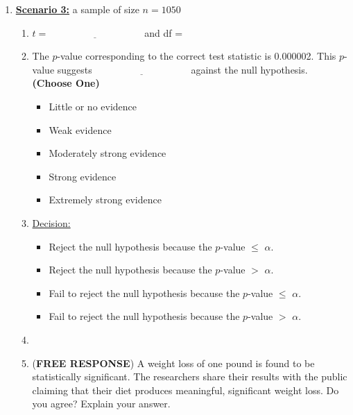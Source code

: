 \begin{enumerate}
\begin{enumerate}
\begin{enumerate}
\item \underline{Decision:}
\begin{itemize}
\item Reject the null hypothesis because the $p$-value $\leq$ $\alpha$.
\item Reject the null hypothesis because the $p$-value $>$ $\alpha$.
\item Fail to reject the null hypothesis because the $p$-value $\leq$ $\alpha$.
\item Fail to reject the null hypothesis because the $p$-value $>$ $\alpha$.
\end{itemize}
\end{enumerate}
\newpage
\item \textbf{\underline{Scenario 3:}} a sample of size $n = 1050$\\
\begin{enumerate}
\vspace{0.25cm}
\item $t = \underline{\hspace{4cm}}$  and df = \underline{\hspace{4cm}}
\item  The $p$-value corresponding to the correct test statistic is 0.000002. This $p$-value suggests $\underline{\hspace{4cm}}$ against the null hypothesis. \textbf{(Choose One)}
\begin{itemize}
\item Little or no evidence
\item Weak evidence
\item Moderately strong evidence
\item Strong evidence
\item Extremely strong evidence
\end{itemize}

\item \underline{Decision:}
\begin{itemize}
\item Reject the null hypothesis because the $p$-value $\leq$ $\alpha$.
\item Reject the null hypothesis because the $p$-value $>$ $\alpha$.
\item Fail to reject the null hypothesis because the $p$-value $\leq$ $\alpha$.
\item Fail to reject the null hypothesis because the $p$-value $>$ $\alpha$.
\end{itemize}
\item[]
\item  (\textbf{FREE RESPONSE}) A weight loss of one pound is found to be statistically significant. The researchers share their results with the public claiming that their diet produces meaningful, significant weight loss. Do you agree? Explain your answer.
\end{enumerate}


\end{enumerate}
\end{enumerate}
